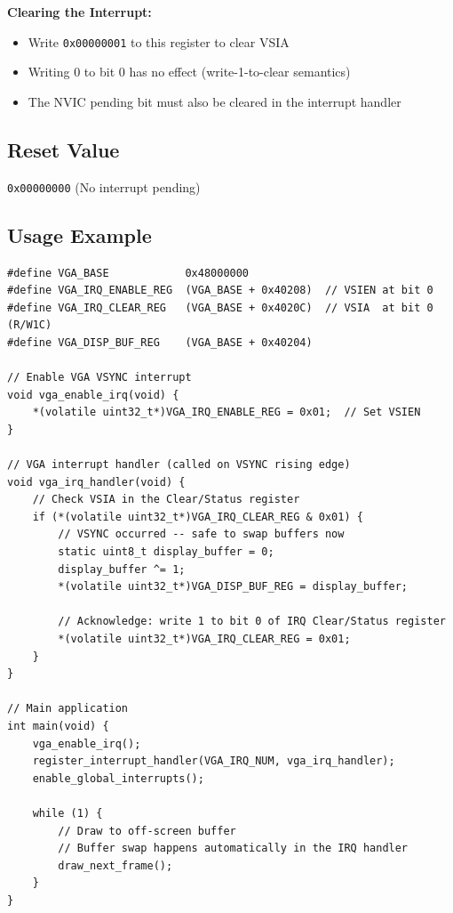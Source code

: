 \documentclass[11pt,letterpaper]{report}
\begin{document}
\textbf{Clearing the Interrupt:}
\begin{itemize}
    \item Write \texttt{0x00000001} to this register to clear VSIA
    \item Writing 0 to bit 0 has no effect (write-1-to-clear semantics)
    \item The NVIC pending bit must also be cleared in the interrupt handler
\end{itemize}

\subsection{Reset Value}

\texttt{0x00000000} (No interrupt pending)

\subsection{Usage Example}

\begin{lstlisting}[style=c,caption={Interrupt-Driven Double-Buffering}]
#define VGA_BASE            0x48000000
#define VGA_IRQ_ENABLE_REG  (VGA_BASE + 0x40208)  // VSIEN at bit 0
#define VGA_IRQ_CLEAR_REG   (VGA_BASE + 0x4020C)  // VSIA  at bit 0 (R/W1C)
#define VGA_DISP_BUF_REG    (VGA_BASE + 0x40204)

// Enable VGA VSYNC interrupt
void vga_enable_irq(void) {
    *(volatile uint32_t*)VGA_IRQ_ENABLE_REG = 0x01;  // Set VSIEN
}

// VGA interrupt handler (called on VSYNC rising edge)
void vga_irq_handler(void) {
    // Check VSIA in the Clear/Status register
    if (*(volatile uint32_t*)VGA_IRQ_CLEAR_REG & 0x01) {
        // VSYNC occurred -- safe to swap buffers now
        static uint8_t display_buffer = 0;
        display_buffer ^= 1;
        *(volatile uint32_t*)VGA_DISP_BUF_REG = display_buffer;

        // Acknowledge: write 1 to bit 0 of IRQ Clear/Status register
        *(volatile uint32_t*)VGA_IRQ_CLEAR_REG = 0x01;
    }
}

// Main application
int main(void) {
    vga_enable_irq();
    register_interrupt_handler(VGA_IRQ_NUM, vga_irq_handler);
    enable_global_interrupts();

    while (1) {
        // Draw to off-screen buffer
        // Buffer swap happens automatically in the IRQ handler
        draw_next_frame();
    }
}
\end{lstlisting}
\end{document}

